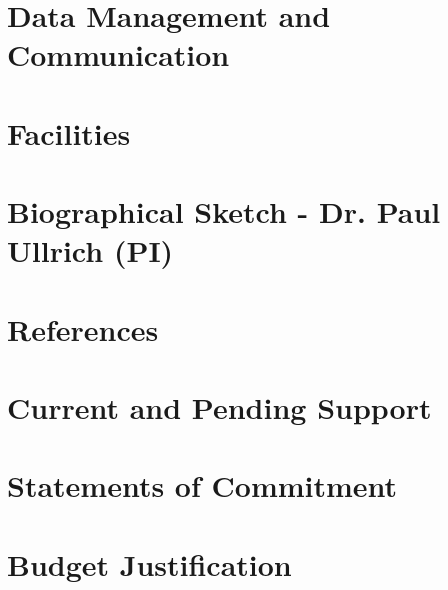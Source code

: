 \documentclass[11pt]{article}
\begin{document}
\section{Data Management and Communication}

\section{Facilities}

\section{Biographical Sketch - Dr. Paul Ullrich (PI)}

\section{References}

\section{Current and Pending Support}

\section{Statements of Commitment}

\section{Budget Justification}
\end{document}
